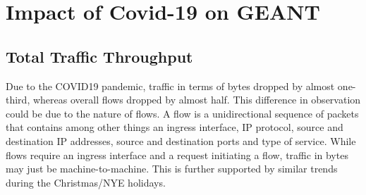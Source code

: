 \documentclass[10pt, journal, letterpaper]{IEEEtran}
\begin{document}
\section{Impact of Covid-19 on GEANT}

\subsection{Total Traffic Throughput}
Due to the COVID19 pandemic, traffic in terms of bytes dropped by almost one-third, whereas overall flows dropped by almost half. This difference in observation could be due to the nature of flows. A flow is a unidirectional sequence of packets that contains among other things an ingress interface, IP protocol, source and destination IP addresses, source and destination ports and type of service. While flows require an ingress interface and a request initiating a flow, traffic in bytes may just be machine-to-machine. This is further supported by similar trends during the Christmas/NYE holidays.
\end{document}
